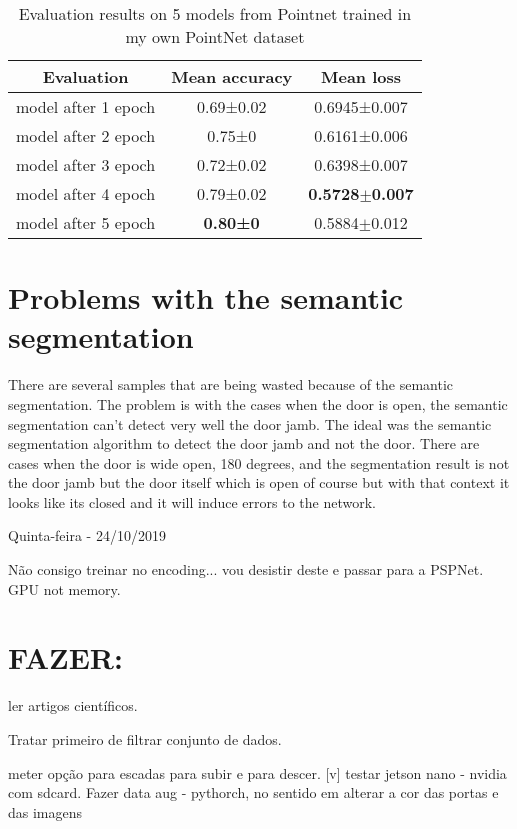 \begin{table}[h]
\centering
\begin{tabular}{|c|c|c|}
\hline
\textbf{Evaluation} & \textbf{Mean accuracy} & \textbf{Mean loss} \\ \hline
model after 1 epoch & 0.69±0.02 & 0.6945±0.007 \\ \hline
model after 2 epoch & 0.75±0 & 0.6161±0.006 \\ \hline
model after 3 epoch & 0.72±0.02 & 0.6398±0.007 \\ \hline
model after 4 epoch & 0.79±0.02 & \textbf{0.5728$\pm$0.007} \\ \hline
model after 5 epoch & \textbf{0.80±0} & 0.5884$\pm$0.012 \\ \hline
\end{tabular}
\caption{Evaluation results on 5 models from Pointnet trained in my own PointNet dataset}
\label{tab:table_results}
\end{table}
    
    
\section{Problems with the semantic segmentation}

    There are several samples that are being wasted because of the semantic segmentation. The problem is with the cases when the door is open, the semantic segmentation can't detect very well the door jamb. The ideal was the semantic segmentation algorithm to detect the door jamb and not the door. There are cases when the door is wide open, 180 degrees, and the segmentation result is not the door jamb but the door itself which is open of course but with that context it looks like its closed and it will induce errors to the network.
    
    
    
    
    Quinta-feira - 24/10/2019
    
    
    Não consigo treinar no encoding... vou desistir deste e passar para a PSPNet. GPU not memory.
    
    
    \section{FAZER:}
    
    ler artigos científicos.
    
    Tratar primeiro de filtrar conjunto de dados.
    
    meter opção para escadas para subir e para descer. [v]
    testar jetson nano - nvidia com sdcard.
    Fazer data aug - pythorch, no sentido em alterar a cor das portas e das imagens
    
